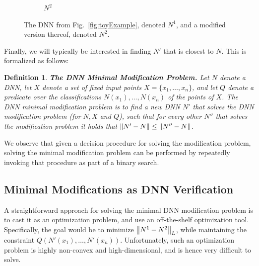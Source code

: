 \documentclass{easychair}
\newtheorem{definition}{Definition}
\begin{document}
\begin{figure}[htp]
\begin{subfigure}{0.5\linewidth}
    \caption{$N^2$}
  \end{subfigure}
  \caption{The DNN from Fig.~\ref{fig:toyExample}, denoted $N^1$, and
    a modified version thereof, denoted $N^2$.}
  \label{fig:toyExampleModified}
\end{figure}

Finally, we will typically be interested in finding $N'$ that is
closest to $N$. This is formalized as follows:
\begin{definition}\textbf{The DNN Minimal Modification Problem.}
  Let $N$ denote a DNN, let $X$ denote a set of fixed input points
  $X=\{x_1, \ldots, x_n\}$, and let $Q$ denote a predicate over the
  classifications $N(x_1),\ldots,N(x_n)$ of the points of $X$. The
  \emph{DNN minimal modification problem} is to find a new DNN $N'$
  that solves the DNN modification problem (for $N, X$ and $Q$), such that for every other
  $N''$ that solves the modification problem it holds that
  $\left\lVert N'-N\right\rVert\leq \left\lVert N''-N\right\rVert$.
\end{definition}
We observe that given a decision procedure for solving the modification
problem, solving the minimal modification problem can be performed by
repeatedly invoking that procedure as part of a binary search.

\subsection{Minimal Modifications as DNN Verification}

A straightforward approach for solving the minimal DNN modification
problem is to cast it as an optimization problem, and use an
off-the-shelf optimization tool. Specifically, the goal would be to
minimize $\left\lVert N^1-N^2\right\rVert_L$, while maintaining the constraint
$Q(N'(x_1),\ldots, N'(x_n))$. Unfortunately, such an optimization
problem is highly non-convex and high-dimensional, and is hence very
difficult to solve.
\end{document}
